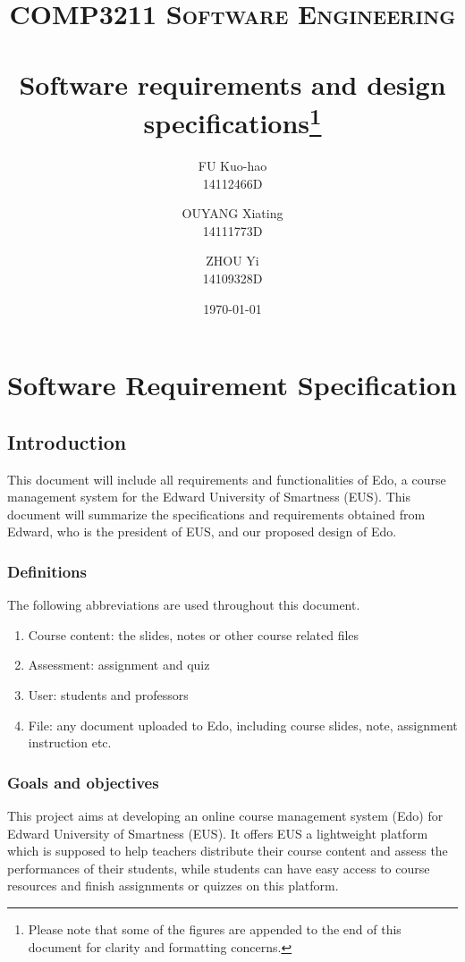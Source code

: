 \documentclass[paper=a4, fontsize=11pt]{scrartcl}
\title{
		\usefont{OT1}{bch}{b}{n}
		\normalfont \normalsize \textsc{COMP3211 Software Engineering} \\ [25pt]
		\horrule{0.5pt} \\[0.4cm]
		\huge Software requirements and design specifications\footnote{Please note that some of the figures are appended to the end of this document for clarity and formatting concerns.}
		\horrule{2pt} \\[0.5cm]
}
\author{
		\normalfont 								
        FU Kuo-hao \\
        14112466D
        \and
        OUYANG Xiating \\
        14111773D
        \and
        ZHOU Yi \\
        14109328D
}
\date{\today}
\numberwithin{equation}{section}		%
\numberwithin{figure}{section}			%
\numberwithin{table}{section}				%
\begin{document}
\begin{titlepage}
\maketitle

\end{titlepage}

\begin{titlepage}
\tableofcontents
\end{titlepage}


\section{Software Requirement Specification}

\subsection{Introduction}
This document will include all requirements and functionalities of Edo, a course management system for the Edward University of Smartness (EUS). This document will summarize the specifications and requirements obtained from Edward, who is the president of EUS, and our proposed design of Edo.

\subsubsection{Definitions}
The following abbreviations are used throughout this document.
\begin{enumerate}
	\item Course content: the slides, notes or other course related files
	\item Assessment: assignment and quiz
	\item User: students and professors
	\item File: any document uploaded to Edo, including course slides, note, assignment instruction etc.
\end{enumerate}

\subsubsection{Goals and objectives}
This project aims at developing an online course management system (Edo) for Edward University of Smartness (EUS). It offers EUS a lightweight platform which is supposed to help teachers distribute their course content and assess the performances of their students, while students can have easy access to course resources and finish assignments or quizzes on this platform.
\end{document}
